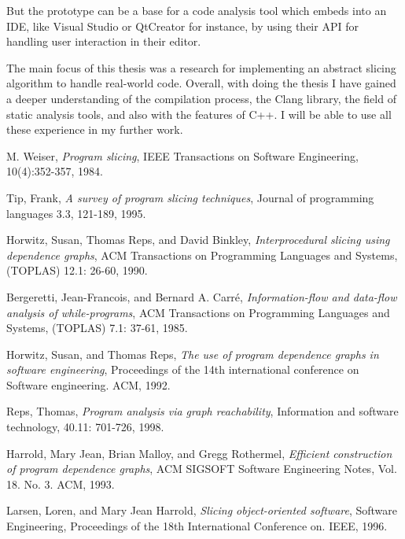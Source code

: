 \documentclass[oneside,12pt,a4paper]{book}
\begin{document}
But the prototype can be a base for a code analysis tool which embeds into an IDE, like Visual Studio or QtCreator for instance, by using their API for handling user interaction in their editor. 

The main focus of this thesis was a research for implementing an abstract slicing algorithm to handle real-world code. Overall, with doing the thesis I have gained a deeper understanding of the compilation process, the Clang library, the field of static analysis tools, and also with the features of C++. I will be able to use all these experience in my further work. 



\begin{thebibliography}{Textttext}
  M. Weiser,
  \emph{Program slicing},
  IEEE Transactions on Software Engineering,
  10(4):352-357,
  1984.

  Tip, Frank,
  \emph{A survey of program slicing techniques},
  Journal of programming languages 3.3,
  121-189,
  1995. 

  Horwitz, Susan, Thomas Reps, and David Binkley,
  \emph{Interprocedural slicing using dependence graphs}, 
  ACM Transactions on Programming Languages and Systems,
  (TOPLAS) 12.1: 26-60,
  1990.

  Bergeretti, Jean-Francois, and Bernard A. Carré,
  \emph{Information-flow and data-flow analysis of while-programs},
  ACM Transactions on Programming Languages and Systems,
  (TOPLAS) 7.1: 37-61,
  1985.

  Horwitz, Susan, and Thomas Reps,
  \emph{The use of program dependence graphs in software engineering},
  Proceedings of the 14th international conference on Software engineering. 
  ACM,
  1992.

  Reps, Thomas,
  \emph{Program analysis via graph reachability},
  Information and software technology,
  40.11: 701-726,
  1998.

  Harrold, Mary Jean, Brian Malloy, and Gregg Rothermel,
  \emph{Efficient construction of program dependence graphs},
  ACM SIGSOFT Software Engineering Notes,
  Vol. 18. No. 3. ACM,
  1993.

  Larsen, Loren, and Mary Jean Harrold,
  \emph{Slicing object-oriented software},
  Software Engineering,
  Proceedings of the 18th International Conference on. IEEE,
  1996.


\end{thebibliography}
\end{document}
